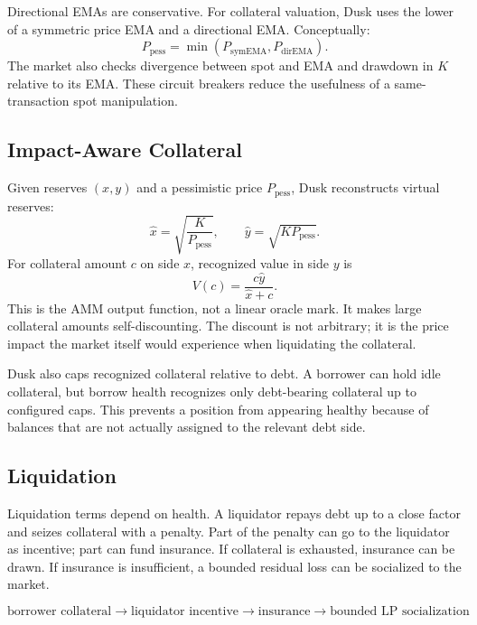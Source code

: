 \documentclass[11pt]{article}
\begin{document}
Directional EMAs are conservative. For collateral valuation, Dusk uses the lower of a symmetric price EMA and a directional EMA. Conceptually:
\begin{equation}
P_{\mathrm{pess}}=\min(P_{\mathrm{symEMA}},P_{\mathrm{dirEMA}}).
\end{equation}
The market also checks divergence between spot and EMA and drawdown in $K$ relative to its EMA. These circuit breakers reduce the usefulness of a same-transaction spot manipulation.

\subsection{Impact-Aware Collateral}

Given reserves $(x,y)$ and a pessimistic price $P_{\mathrm{pess}}$, Dusk reconstructs virtual reserves:
\begin{equation}
\hat x=\sqrt{\frac{K}{P_{\mathrm{pess}}}},\qquad
\hat y=\sqrt{KP_{\mathrm{pess}}}.
\end{equation}
For collateral amount $c$ on side $x$, recognized value in side $y$ is
\begin{equation}
V(c)=\frac{c\hat y}{\hat x+c}.
\end{equation}
This is the AMM output function, not a linear oracle mark. It makes large collateral amounts self-discounting. The discount is not arbitrary; it is the price impact the market itself would experience when liquidating the collateral.

Dusk also caps recognized collateral relative to debt. A borrower can hold idle collateral, but borrow health recognizes only debt-bearing collateral up to configured caps. This prevents a position from appearing healthy because of balances that are not actually assigned to the relevant debt side.

\subsection{Liquidation}

Liquidation terms depend on health. A liquidator repays debt up to a close factor and seizes collateral with a penalty. Part of the penalty can go to the liquidator as incentive; part can fund insurance. If collateral is exhausted, insurance can be drawn. If insurance is insufficient, a bounded residual loss can be socialized to the market.

\[
\boxed{
\text{borrower collateral}
\rightarrow
\text{liquidator incentive}
\rightarrow
\text{insurance}
\rightarrow
\text{bounded LP socialization}
}
\]
\end{document}
